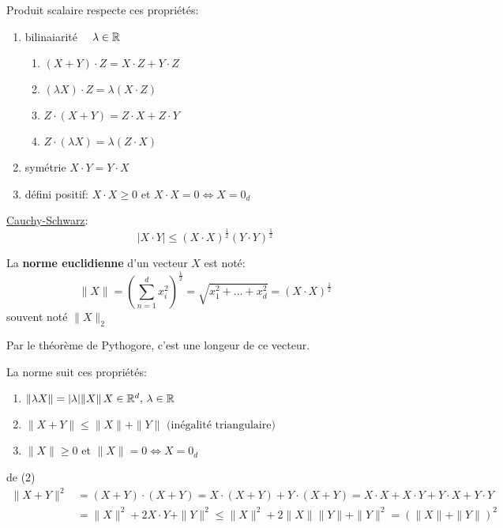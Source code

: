 \begin{prop}
    Produit scalaire respecte ces propriétés:
    \begin{enumerate}
        \item bilinaiarité $\quad \lambda \in \mathbb{R}$
            \begin{enumerate}
                \item $(X + Y) \cdot Z = X \cdot Z + Y \cdot Z$
                \item $(\lambda X) \cdot Z = \lambda (X \cdot Z)$
                \item $Z \cdot (X + Y) = Z \cdot X + Z \cdot Y$ 
                \item $Z \cdot (\lambda X) = \lambda (Z \cdot X)$
            \end{enumerate}
        \item symétrie $X \cdot Y = Y \cdot X$
        \item défini positif:  $X \cdot X \ge 0$ et $X \cdot X = 0 \iff X = 0_d$
    \end{enumerate}
\end{prop}
\begin{prop}
    \underline{Cauchy-Schwarz}:\\ 
    \[
        |X \cdot Y| \le (X \cdot X)^{\frac{1}{2}}(Y \cdot Y)^{\frac{1}{2}}
    \] 
\end{prop}
\begin{definition}\label{def:norm_eucl}
    La \textbf{norme euclidienne} d'un vecteur $X$ est noté:
   \[
       \|X\| = \left(\sum_{n=1}^{d} x_i^2\right)^{\frac{1}{2}} = \sqrt{x_1^2 + \ldots + x_d^2} = (X \cdot X)^{\frac{1}{2}}
   \] 
   souvent noté $\|X\|_2$
\end{definition}
\begin{intuition}
   Par le théorème de Pythogore, c'est une longeur de ce vecteur. 
\end{intuition}
\begin{prop}
    La norme suit ces propriétés:
   \begin{enumerate}
       \item $\|\lambda X\| = |\lambda|\|X\| \, X \in \mathbb{R}^d, \, \lambda \in \mathbb{R}$
       \item $\|X + Y\| \le \|X\| + \|Y\| \text{ (inégalité triangulaire)}$
       \item $\|X\| \ge 0$ et $\|X\| = 0 \iff X = 0_d$
   \end{enumerate}
\end{prop}
\begin{explanation}
    de (2)
    \begin{align*}
        \|X + Y\|^2 &= (X + Y)\cdot(X + Y) = X \cdot (X + Y) + Y \cdot (X + Y) = X \cdot X + X \cdot Y + Y \cdot X + Y \cdot Y\\
                    &= \|X\|^2 + 2X \cdot Y + \|Y\|^2 \le \|X\|^2 + 2\|X\| \|Y\| + \|Y\|^2 = (\|X\| + \|Y\|)^2
    \end{align*}
\end{explanation}
